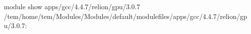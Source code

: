 \documentclass[letterpaper,10pt,english]{sphinxmanual}
\begin{document}
\begin{sphinxVerbatim}[commandchars=\\\{\}]
\PYGZdl{}\PYGZgt{} module show apps/gcc/4.4.7/relion/gpu/3.0.7
\PYGZhy{}\PYGZhy{}\PYGZhy{}\PYGZhy{}\PYGZhy{}\PYGZhy{}\PYGZhy{}\PYGZhy{}\PYGZhy{}\PYGZhy{}\PYGZhy{}\PYGZhy{}\PYGZhy{}\PYGZhy{}\PYGZhy{}\PYGZhy{}\PYGZhy{}\PYGZhy{}\PYGZhy{}\PYGZhy{}\PYGZhy{}\PYGZhy{}\PYGZhy{}\PYGZhy{}\PYGZhy{}\PYGZhy{}\PYGZhy{}\PYGZhy{}\PYGZhy{}\PYGZhy{}\PYGZhy{}\PYGZhy{}\PYGZhy{}\PYGZhy{}\PYGZhy{}\PYGZhy{}\PYGZhy{}\PYGZhy{}\PYGZhy{}\PYGZhy{}\PYGZhy{}\PYGZhy{}\PYGZhy{}\PYGZhy{}\PYGZhy{}\PYGZhy{}\PYGZhy{}\PYGZhy{}\PYGZhy{}\PYGZhy{}\PYGZhy{}\PYGZhy{}\PYGZhy{}\PYGZhy{}\PYGZhy{}\PYGZhy{}\PYGZhy{}\PYGZhy{}\PYGZhy{}\PYGZhy{}\PYGZhy{}\PYGZhy{}\PYGZhy{}\PYGZhy{}\PYGZhy{}\PYGZhy{}\PYGZhy{}
/tem/home/tem/Modules/Modules/default/modulefiles/apps/gcc/4.4.7/relion/gpu/3.0.7:


\end{sphinxVerbatim}
\end{document}
